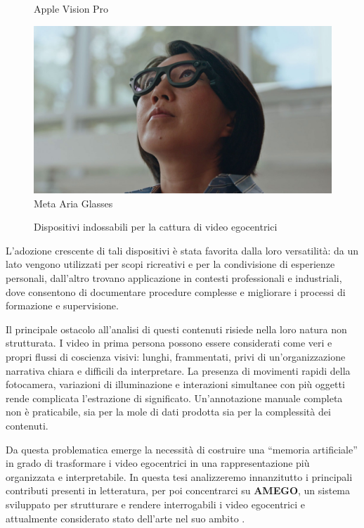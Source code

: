 \begin{figure}[ht]
\begin{minipage}{0.3\linewidth}
        Apple Vision Pro \cite{AppleVisionPro2025}
    \end{minipage}
    \hfill
    \begin{minipage}{0.3\linewidth}
        \centering
        \includegraphics[width=\linewidth]{Images/ariaglasses.png}\\
        Meta Aria Glasses \cite{ProjectAria2025}
    \end{minipage}
    \caption{Dispositivi indossabili per la cattura di video egocentrici}
    \label{fig:dispositivi_egocentrici}
\end{figure}

L'adozione crescente di tali dispositivi è stata favorita dalla loro versatilità: da un lato vengono utilizzati per scopi ricreativi e per la condivisione di esperienze personali, dall'altro trovano applicazione in contesti professionali e industriali, dove consentono di documentare procedure complesse e migliorare i processi di formazione e supervisione.

Il principale ostacolo all'analisi di questi contenuti risiede nella loro natura non strutturata. I video in prima persona possono essere considerati come veri e propri flussi di coscienza visivi: lunghi, frammentati, privi di un'organizzazione narrativa chiara e difficili da interpretare. La presenza di movimenti rapidi della fotocamera, variazioni di illuminazione e interazioni simultanee con più oggetti rende complicata l'estrazione di significato. Un'annotazione manuale completa non è praticabile, sia per la mole di dati prodotta sia per la complessità dei contenuti.

Da questa problematica emerge la necessità di costruire una “memoria artificiale” in grado di trasformare i video egocentrici in una rappresentazione più organizzata e interpretabile. In questa tesi analizzeremo innanzitutto i principali contributi presenti in letteratura, per poi concentrarci su \textbf{AMEGO}\cite{goletto2024amego}, un sistema sviluppato per strutturare e rendere interrogabili i video egocentrici e attualmente considerato stato dell'arte nel suo ambito \cite{goletto2024amego}.

